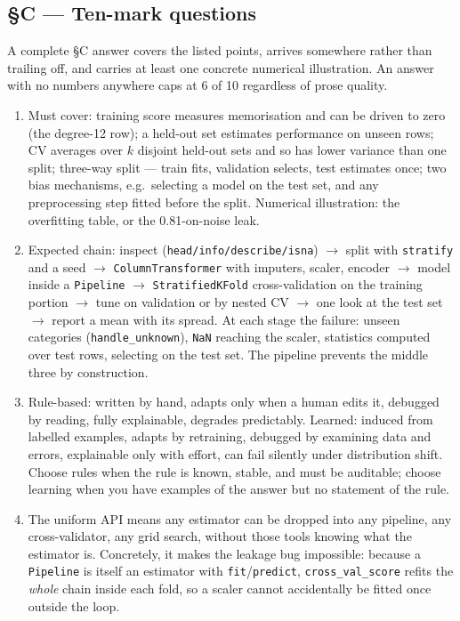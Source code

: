 \documentclass[11pt,a4paper]{article}
\newcommand{\A}[1]{\item[\textbf{#1}]}
\begin{document}
\subsection*{§C --- Ten-mark questions}

\noindent\small A complete §C answer covers the listed points, arrives somewhere rather than trailing off, and carries at least one concrete numerical illustration. An answer with no numbers anywhere
caps at 6 of 10 regardless of prose quality.\normalsize

\begin{enumerate}[leftmargin=1.9cm]

\A{U1.21} Must cover: training score measures memorisation and can be driven to
zero (the degree-12 row); a held-out set estimates performance on unseen rows;
CV averages over $k$ disjoint held-out sets and so has lower variance than one
split; three-way split --- train fits, validation selects, test estimates once;
two bias mechanisms, e.g.\ selecting a model on the test set, and any
preprocessing step fitted before the split. Numerical illustration: the
overfitting table, or the 0.81-on-noise leak.

\A{U1.22} Expected chain: inspect (\texttt{head/info/describe/isna}) $\to$
split with \texttt{stratify} and a seed $\to$ \texttt{ColumnTransformer} with
imputers, scaler, encoder $\to$ model inside a \texttt{Pipeline} $\to$
\texttt{StratifiedKFold} cross-validation on the training portion $\to$ tune on
validation or by nested CV $\to$ one look at the test set $\to$ report a mean
with its spread. At each stage the failure: unseen categories
(\texttt{handle\_unknown}), \texttt{NaN} reaching the scaler, statistics
computed over test rows, selecting on the test set. The pipeline prevents the
middle three by construction.

\A{U1.23} Rule-based: written by hand, adapts only when a human edits it,
debugged by reading, fully explainable, degrades predictably. Learned: induced
from labelled examples, adapts by retraining, debugged by examining data and
errors, explainable only with effort, can fail silently under distribution
shift. Choose rules when the rule is known, stable, and must be auditable;
choose learning when you have examples of the answer but no statement of the
rule.

\A{U1.24} The uniform API means any estimator can be dropped into any
pipeline, any cross-validator, any grid search, without those tools knowing
what the estimator is. Concretely, it makes the leakage bug impossible: because
a \texttt{Pipeline} is itself an estimator with \texttt{fit}/\texttt{predict},
\texttt{cross\_val\_score} refits the \emph{whole} chain inside each fold, so a
scaler cannot accidentally be fitted once outside the loop.

\end{enumerate}
\end{document}
